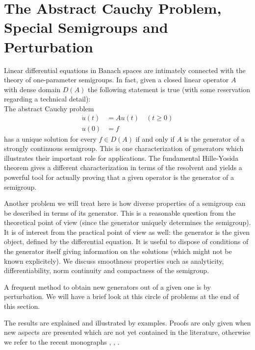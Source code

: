 \section{The Abstract Cauchy Problem, Special Semigroups and Perturbation} \label{sec:a2-1}
\hspace{1cm}{\Large by Wolfgang Arendt}
\vspace{.5cm}
\newline
Linear differential equations in Banach spaces are intimately connected with the theory of one-parameter semigroups.
In fact, given a closed linear operator $A$ with dense domain $D(A)$ the following statement is true (with some reservation regarding a technical detail): \\
The abstract Cauchy problem
\begin{align*}
\dot{u}(t) &= Au(t) \quad (t \geq 0) \\
u(0) &= f 
\end{align*}
has a unique solution for every $f \in D(A)$ if and only if $A$ is the generator of a strongly continuous semigroup.
This is one characterization of generators which illustrates their important role for applications.
The fundamental Hille-Yosida theorem gives a different characterization in terms of the resolvent and yields a powerful tool for actually proving that a given operator is the generator of a semigroup.

Another problem we will treat here is how diverse properties of a semigroup can be described in terms of its generator.
This is a reasonable question from the theoretical point of view (since the generator uniquely determines the semigroup).
It is of interest from the practical point of view as well: the generator is the given object, defined by the differential equation.
It is useful to dispose of conditions of the generator itself giving information on the solutions (which might not be known explicitely).
We discuss smoothness properties such as analyticity, differentiability, norm continuity and compactness of the semigroup.

A frequent method to obtain new generators out of a given one is by perturbation.
We will have a brief look at this circle of problems at the end of this section.

The results are explained and illustrated by examples.
Proofs are only given when new aspects are presented which are not yet contained in the literature, otherwise we refer to the recent monographs \citet{davies:1980}, \citet{goldstein:1985a}, \citet{pazy:1983}.
